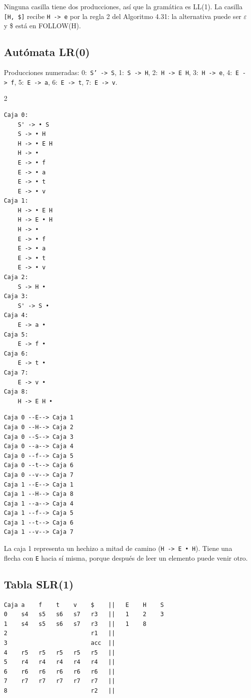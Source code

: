 \documentclass[11pt,a4paper]{article}
\newcommand{\code}[1]{\texttt{#1}}
\begin{document}
Ninguna casilla tiene dos producciones, así que la gramática es LL(1). La casilla \code{[H, \$]} recibe \code{H -> e} por la regla 2 del Algoritmo 4.31: la alternativa puede ser $\varepsilon$ y \$ está en FOLLOW(H).

\subsection{Autómata LR(0)}

Producciones numeradas: 0:~\code{S' -> S}, 1:~\code{S -> H}, 2:~\code{H -> E H}, 3:~\code{H -> e}, 4:~\code{E -> f}, 5:~\code{E -> a}, 6:~\code{E -> t}, 7:~\code{E -> v}.

\begin{multicols}{2}
\begin{Verbatim}[fontsize=\footnotesize]
Caja 0:
    S' -> • S
    S -> • H
    H -> • E H
    H -> •
    E -> • f
    E -> • a
    E -> • t
    E -> • v
Caja 1:
    H -> • E H
    H -> E • H
    H -> •
    E -> • f
    E -> • a
    E -> • t
    E -> • v
Caja 2:
    S -> H •
Caja 3:
    S' -> S •
Caja 4:
    E -> a •
Caja 5:
    E -> f •
Caja 6:
    E -> t •
Caja 7:
    E -> v •
Caja 8:
    H -> E H •
\end{Verbatim}
\columnbreak
\begin{Verbatim}[fontsize=\footnotesize]
Caja 0 --E--> Caja 1
Caja 0 --H--> Caja 2
Caja 0 --S--> Caja 3
Caja 0 --a--> Caja 4
Caja 0 --f--> Caja 5
Caja 0 --t--> Caja 6
Caja 0 --v--> Caja 7
Caja 1 --E--> Caja 1
Caja 1 --H--> Caja 8
Caja 1 --a--> Caja 4
Caja 1 --f--> Caja 5
Caja 1 --t--> Caja 6
Caja 1 --v--> Caja 7
\end{Verbatim}
\end{multicols}

La caja 1 representa un hechizo a mitad de camino (\code{H -> E • H}). Tiene una flecha con \code{E} hacia sí misma, porque después de leer un elemento puede venir otro.

\subsection{Tabla SLR(1)}

\begin{Verbatim}
Caja a    f    t    v    $    ||   E    H    S
0    s4   s5   s6   s7   r3   ||   1    2    3
1    s4   s5   s6   s7   r3   ||   1    8
2                        r1   ||
3                        acc  ||
4    r5   r5   r5   r5   r5   ||
5    r4   r4   r4   r4   r4   ||
6    r6   r6   r6   r6   r6   ||
7    r7   r7   r7   r7   r7   ||
8                        r2   ||
\end{Verbatim}
\end{document}

